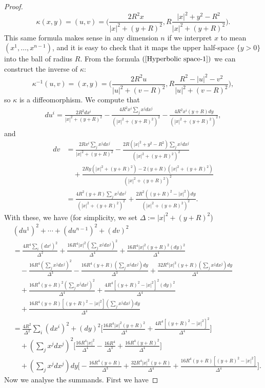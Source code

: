 \begin{proof}
\[\kappa(x,y)=(u,v)=\Big(\frac{2R^2x}{|x|^2+(y+R)^2},R\frac{|x|^2+y^2-R^2}{|x|^2+(y+R)^2}\Big).\]
This same formula makes sense in any dimension $n$ if we interpret $x$ to mean $(x^1,\dots,x^{n-1})$, and it is easy to check that it maps the upper half-space $\{y>0\}$ into the ball of radius $R$. From 
the formula $(\ref{Hyperbolic space-1})$ we can construct the inverse of $\kappa$:
\[\kappa^{-1}(u,v)=(x,y)=\Big(\frac{2R^2u}{|u|^2+(v-R)^2},R\frac{R^2-|u|^2-v^2}{|u|^2+(v-R)^2}\Big),\]
so $\kappa$ is a diffeomorphism. We compute that
\begin{align*}
du^i=\frac{2R^2dx^i}{|x|^2+(y+R)^2}-\frac{4R^2x^i\sum_jx^jdx^j}{(|x|^2+(y+R)^2)^2}-\frac{4R^2x^i(y+R)dy}{(|x|^2+(y+R)^2)^2},
\end{align*}
and
\begin{align*}
dv&=\frac{2Rx^i\sum_jx^jdx^j}{|x|^2+(y+R)^2}-\frac{2R(|x|^2+y^2-R^2)\sum_jx^jdx^j}{(|x|^2+(y+R)^2)^2}\\
&\quad +\frac{2Ry(|x|^2+(y+R)^2)-2(y+R)(|x|^2+(y+R)^2)}{(|x|^2+(y+R)^2)^2}\\
&=\frac{4R^2(y+R)\sum_jx^jdx^j}{(|x|^2+(y+R)^2)^2}+\frac{2R^2((y+R)^2-|x|^2)dy}{(|x|^2+(y+R)^2)^2}.
\end{align*}
With these, we have (for simplicity, we set $\Delta:=|x|^2+(y+R)^2$)
\begin{align*}
&(du^1)^2+\cdots+(du^{n-1})^2+(dv)^2\\
&=\frac{4R^4\sum_i(dx^i)^2}{\Delta^2}+\frac{16R^4|x|^2(\sum_jx^jdx^j)^2}{\Delta^4}+\frac{16R^4|x|^2(y+R)^2(dy)^2}{\Delta^4}\\
&\quad -\frac{16R^4(\sum_jx^jdx^j)^2}{\Delta^3}-\frac{16R^4(y+R)(\sum_jx^jdx^j)dy}{\Delta^3}+\frac{32R^4|x|^2(y+R)(\sum_jx^jdx^j)dy}{\Delta^4}\\
&\quad +\frac{16R^4(y+R)^2(\sum_jx^jdx^j)^2}{\Delta^4}+\frac{4R^4[(y+R)^2-|x|^2]^2(dy)^2}{\Delta^4}\\
&\quad +\frac{16R^4(y+R)[(y+R)^2-|x|^2](\sum_jx^jdx^j)dy}{\Delta^4}\\
&=\frac{4R^2}{\Delta^2}\sum_i(dx^i)^2+(dy)^2\Big[\frac{16R^4|x|^2(y+R)^2}{\Delta^4}+\frac{4R^4[(y+R)^2-|x|^2]^2}{\Delta^4}\Big]\\
&\quad+(\sum_jx^jdx^j)^2\Big[\frac{16R^4|x|^2}{\Delta^4}-\frac{16R^4}{\Delta^3}+\frac{16R^4(y+R)^2}{\Delta^4}\Big]\\
&\quad +(\sum_jx^jdx^j)dy\Big[-\frac{16R^4(y+R)}{\Delta^3}+\frac{32R^4|x|^2(y+R)}{\Delta^4}+\frac{16R^4(y+R)[(y+R)^2-|x|^2]}{\Delta^4}\Big].
\end{align*}
Now we analyse the summands. First we have

\end{proof}

